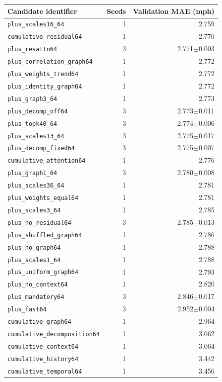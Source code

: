 \begin{tabular}{lrr}
\toprule
Candidate identifier & Seeds & Validation MAE (mph)\\
\midrule
\texttt{plus\_scales16\_64} & 1 & 2.759\\
\texttt{cumulative\_residual64} & 1 & 2.770\\
\texttt{plus\_resattn64} & 3 & 2.771$\pm$0.003\\
\texttt{plus\_correlation\_graph64} & 1 & 2.772\\
\texttt{plus\_weights\_trend64} & 1 & 2.772\\
\texttt{plus\_identity\_graph64} & 1 & 2.772\\
\texttt{plus\_graph3\_64} & 1 & 2.773\\
\texttt{plus\_decomp\_off64} & 3 & 2.773$\pm$0.011\\
\texttt{plus\_topk40\_64} & 3 & 2.774$\pm$0.006\\
\texttt{plus\_scales13\_64} & 3 & 2.775$\pm$0.017\\
\texttt{plus\_decomp\_fixed64} & 3 & 2.775$\pm$0.007\\
\texttt{cumulative\_attention64} & 1 & 2.776\\
\texttt{plus\_graph1\_64} & 3 & 2.780$\pm$0.008\\
\texttt{plus\_scales36\_64} & 1 & 2.781\\
\texttt{plus\_weights\_equal64} & 1 & 2.781\\
\texttt{plus\_scales3\_64} & 1 & 2.785\\
\texttt{plus\_no\_residual64} & 3 & 2.785$\pm$0.013\\
\texttt{plus\_shuffled\_graph64} & 1 & 2.786\\
\texttt{plus\_no\_graph64} & 1 & 2.788\\
\texttt{plus\_scales1\_64} & 1 & 2.788\\
\texttt{plus\_uniform\_graph64} & 1 & 2.793\\
\texttt{plus\_no\_context64} & 1 & 2.820\\
\texttt{plus\_mandatory64} & 3 & 2.846$\pm$0.017\\
\texttt{plus\_fast64} & 3 & 2.952$\pm$0.004\\
\texttt{cumulative\_graph64} & 1 & 2.964\\
\texttt{cumulative\_decomposition64} & 1 & 3.062\\
\texttt{cumulative\_context64} & 1 & 3.064\\
\texttt{cumulative\_history64} & 1 & 3.442\\
\texttt{cumulative\_temporal64} & 1 & 3.456\\
\bottomrule
\end{tabular}
